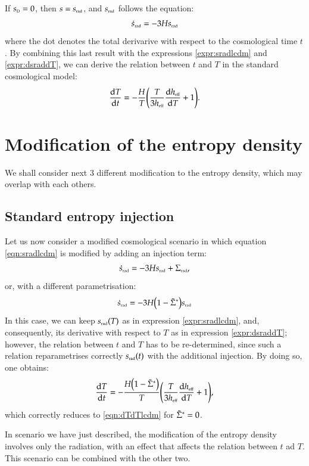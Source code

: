If $s_{\scriptscriptstyle{\textrm{D}}} =0$, then $s=s_{\scriptscriptstyle{\textrm{rad}}}$, and $s_{\scriptscriptstyle{\textrm{rad}}}$ follows the equation:
\begin{align}\label{eqn:sradlcdm}
 \dot{s}_{\scriptscriptstyle{\textrm{rad}}} = -3H s_{\scriptscriptstyle{\textrm{rad}}}
\end{align}
where the dot denotes the total derivarive with respect to the cosmological time $t$.
By combining this last result with the expressions \eqref{expr:sradlcdm} and \eqref{expr:dsraddT}, we can derive the relation
between $t$ and $T$ in the standard cosmological model:
\begin{align}\label{eqn:dTdTlcdm}
 \dv{T}{t} = - \frac{H}{T}\qty( \frac{T}{3h_{\scriptscriptstyle{\textrm{eff}}}}\dv{h_{\scriptscriptstyle{\textrm{eff}}}}{T} +1).
\end{align}

\section{Modification of the entropy density}

We shall consider next 3 different modification to the entropy density, which may
overlap with each others.

\subsection{Standard entropy injection}
Let us now consider a modified cosmological scenario in which equation \eqref{eqn:sradlcdm}
is modified by adding an injection term:
\begin{align}\label{eqn:sradlcdminj}
 \dot{s}_{\scriptscriptstyle{\textrm{rad}}} = -3H s_{\scriptscriptstyle{\textrm{rad}}} +\Sigma_{\scriptscriptstyle{\textrm{rad}}},
\end{align}
or, with a different parametrisation:
\begin{align}\label{eqn:sradlcdminj2}
 \dot{s}_{\scriptscriptstyle{\textrm{rad}}} = -3H\qty(1 - \tilde\Sigma^\ast) s_{\scriptscriptstyle{\textrm{rad}}}
\end{align}
In this case, we can keep $s_{\scriptscriptstyle{\textrm{rad}}}(T)$ as in expression \eqref{expr:sradlcdm}, and,
consequently, its derivative with respect to $T$ as in expression \eqref{expr:dsraddT}; however,
the relation between $t$ and $T$ has to be re-determined,
since such a relation reparametrises correctly $s_{\scriptscriptstyle{\textrm{rad}}}(t)$ with the additional
injection. By doing so, one obtains:
\begin{align}\label{eqn:dTdTsrad}
 \dv{T}{t} = - \frac{H\qty(1 - \tilde\Sigma^\ast)}{T}\qty( \frac{T}{3h_{\scriptscriptstyle{\textrm{eff}}}}\dv{h_{\scriptscriptstyle{\textrm{eff}}}}{T} +1),
\end{align}
which correctly reduces to \eqref{eqn:dTdTlcdm} for $\tilde\Sigma^\ast=0$.

In scenario we have just described, the modification of the entropy density involves
only the radiation, with an effect that affects the relation between $t$ ad $T$.
This scenario can be combined with the other two.

